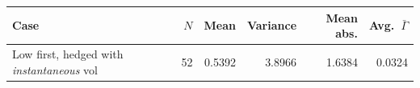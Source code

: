 \begin{tabular}{lrrrrr}
\toprule
Case & $N$ & Mean & Variance & Mean abs. & Avg.\ $\bar\Gamma$ \\
\midrule
Low first, hedged with \emph{instantaneous} vol & 52 & 0.5392 & 3.8966 & 1.6384 & 0.0324 \\
\bottomrule
\end{tabular}
